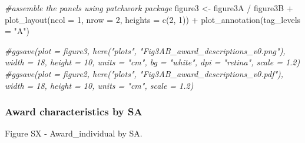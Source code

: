 \documentclass[
]{article}
\newenvironment{Shaded}{\begin{snugshade}}{\end{snugshade}}
\newcommand{\AttributeTok}[1]{\textcolor[rgb]{0.77,0.63,0.00}{#1}}
\newcommand{\CommentTok}[1]{\textcolor[rgb]{0.56,0.35,0.01}{\textit{#1}}}
\newcommand{\DecValTok}[1]{\textcolor[rgb]{0.00,0.00,0.81}{#1}}
\newcommand{\FunctionTok}[1]{\textcolor[rgb]{0.00,0.00,0.00}{#1}}
\newcommand{\NormalTok}[1]{#1}
\newcommand{\OtherTok}[1]{\textcolor[rgb]{0.56,0.35,0.01}{#1}}
\newcommand{\SpecialCharTok}[1]{\textcolor[rgb]{0.00,0.00,0.00}{#1}}
\newcommand{\StringTok}[1]{\textcolor[rgb]{0.31,0.60,0.02}{#1}}
\begin{document}
\begin{Shaded}
\begin{Highlighting}[]
\CommentTok{\#assemble the panels using patchwork package}
\NormalTok{figure3 }\OtherTok{\textless{}{-}}\NormalTok{ figure3A }\SpecialCharTok{/}\NormalTok{ figure3B }\SpecialCharTok{+} 
  \FunctionTok{plot\_layout}\NormalTok{(}\AttributeTok{ncol =} \DecValTok{1}\NormalTok{, }\AttributeTok{nrow =} \DecValTok{2}\NormalTok{, }\AttributeTok{heights =} \FunctionTok{c}\NormalTok{(}\DecValTok{2}\NormalTok{, }\DecValTok{1}\NormalTok{)) }\SpecialCharTok{+} 
  \FunctionTok{plot\_annotation}\NormalTok{(}\AttributeTok{tag\_levels =} \StringTok{"A"}\NormalTok{) }

\CommentTok{\#ggsave(plot = figure3, here("plots", "Fig3AB\_award\_descriptions\_v0.png"), width = 18, height = 10, units = "cm", bg = "white", dpi = "retina", scale = 1.2)}
\CommentTok{\#ggsave(plot = figure2, here("plots", "Fig3AB\_award\_descriptions\_v0.pdf"), width = 18, height = 10, units = "cm", scale = 1.2)}
\end{Highlighting}
\end{Shaded}

\hypertarget{award-characteristics-by-sa}{%
\subsubsection{Award characteristics by
SA}\label{award-characteristics-by-sa}}

Figure SX - Award\_individual by SA.
\end{document}
